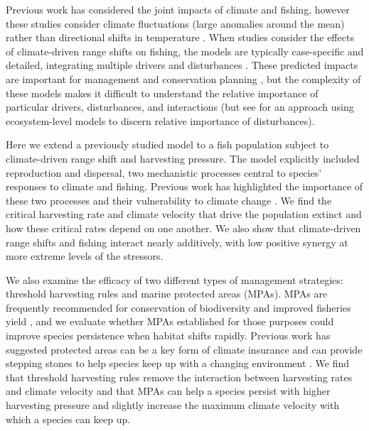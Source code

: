 \documentclass[12pt,english]{article}
\begin{document}
\begin{spacing}{1.9}
\begin{flushleft}
Previous work has considered the joint impacts of climate and fishing, however these studies consider climate fluctuations (large anomalies around the mean) rather than directional shifts in temperature \citep{WaltersParma1996, KingMcFarlane2006}. When studies consider the effects of climate-driven range shifts on fishing, the models are typically case-specific and detailed, integrating multiple drivers and disturbances \citep{Cheungetal2010, Lindegrenetal2010, Brownetal2010, Merinoetal2010, Merinoetal2010b, Plaganyietal2011, Ainsworthetal2011, Zhangetal2011, Barangeetal2011, Howardetal2013}. These predicted impacts are important for management and conservation planning \citep{Allisonetal2009}, but the complexity of these models makes it difficult to  understand the relative importance of particular drivers, disturbances, and interactions (but see \citet{Nyeetal2013} for an approach using ecosystem-level models to discern relative importance of disturbances).

Here we extend a previously studied model \citep{ZhouKot2011} to a fish population subject to climate-driven range shift and harvesting pressure. The model explicitly included reproduction and dispersal, two mechanistic processes central to species' responses to climate and fishing. Previous work has highlighted the importance of these two processes and their vulnerability to climate change \citep{Fordhametal2013, Hastingsetal2005}.  We find the critical harvesting rate and climate velocity that drive the population extinct and how these critical rates depend on one another.   We also show that climate-driven range shifts and fishing interact nearly additively, with low positive synergy at more extreme levels of the stressors.  

We also examine the efficacy of two different types of management strategies: threshold harvesting rules and marine protected areas (MPAs). MPAs are frequently recommended for conservation of biodiversity and improved fisheries yield \citep{Gainesetal2010}, and we evaluate whether MPAs established for those purposes could improve species persistence when habitat shifts rapidly.  Previous work has suggested protected areas can be a key form of climate insurance and can provide stepping stones to help species keep up with a changing environment \citep{Thomasetal2012, Hannahetal2007}.  We find that threshold harvesting rules remove the interaction between harvesting rates and climate velocity and that MPAs can help a species persist with higher harvesting pressure and slightly increase the maximum climate velocity with which a species can keep up.


\end{flushleft}
\end{spacing}
\end{document}
